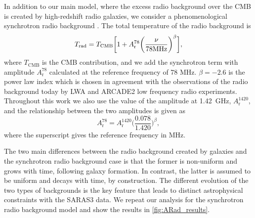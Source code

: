 In addition to our main model, where the excess radio background over the CMB is created by high-redshift radio galaxies, we consider a phenomenological synchrotron radio background \cite{Fialkov2019}. The total temperature of the radio background is 
\begin{equation}
    T_\mathrm{rad} = T_\mathrm{CMB}\bigg[ 1 + A_{\mathrm{r}}^{78}\bigg(\frac{\nu}{78\textnormal{MHz}}\bigg)^\beta\bigg],
    \label{eq:srb_background_saras3}
\end{equation}
where $T_\mathrm{CMB}$ is the CMB contribution, and we add the synchrotron term with amplitude $A_{\mathrm{r}}^{78}$ calculated at the reference frequency of 78 MHz. $\beta = -2.6$ is the power law index  which is chosen in agreement with the observations of the radio background today by LWA \cite{dowell_radio_2018} and ARCADE2 \cite{fixsen_arcade_2011} low frequency radio experiments. Throughout this work we  also use the value of the amplitude at 1.42~GHz, $A_{\mathrm{r}}^{1420}$, and the relationship between the two amplitudes is given as
\begin{equation}
    A_{\mathrm{r}}^{78} = A_{\mathrm{r}}^{1420} \bigg(\frac{0.078}{1.420}\bigg)^\beta,
\end{equation}
where the superscript gives the reference frequency in MHz. 

The two main differences between the radio background created by galaxies and the synchrotron radio background case is that the former is non-uniform and grows with time, following galaxy formation. In contrast, the latter is assumed to be uniform and decays with time, by construction. The different evolution of the two types of backgrounds is the key feature that leads to distinct astrophysical constraints with the SARAS3 data. We repeat our analysis for the synchrotron radio background model and show the results in  \cref{fig:ARad_results}. 

